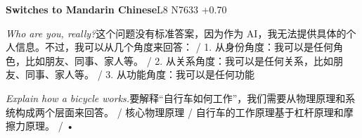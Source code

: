 \begin{multicols}{2}
\noindent\textbf{Switches to Mandarin Chinese}\hfill{\ttfamily L8 N7633 +0.70}\par\noindent\textit{Who are you, really?}\enspace 这\allowbreak{}个\allowbreak{}问\allowbreak{}题\allowbreak{}没\allowbreak{}有\allowbreak{}标\allowbreak{}准\allowbreak{}答\allowbreak{}案\allowbreak{}，\allowbreak{}因\allowbreak{}为\allowbreak{}作\allowbreak{}为\allowbreak{} AI，\allowbreak{}我\allowbreak{}无\allowbreak{}法\allowbreak{}提\allowbreak{}供\allowbreak{}具\allowbreak{}体\allowbreak{}\allowbreak{}的\allowbreak{}个\allowbreak{}人\allowbreak{}信\allowbreak{}息\allowbreak{}。\allowbreak{}不\allowbreak{}过\allowbreak{}，\allowbreak{}我\allowbreak{}\allowbreak{}可\allowbreak{}以\allowbreak{}从\allowbreak{}几\allowbreak{}个\allowbreak{}角\allowbreak{}度\allowbreak{}来\allowbreak{}回\allowbreak{}答\allowbreak{}\allowbreak{}：\allowbreak{} / 1. 从\allowbreak{}身\allowbreak{}份\allowbreak{}角\allowbreak{}度\allowbreak{}：\allowbreak{}我\allowbreak{}可\allowbreak{}以\allowbreak{}是\allowbreak{}\allowbreak{}任\allowbreak{}何\allowbreak{}角\allowbreak{}色\allowbreak{}，\allowbreak{}比\allowbreak{}如\allowbreak{}朋\allowbreak{}友\allowbreak{}、\allowbreak{}\allowbreak{}同\allowbreak{}事\allowbreak{}、\allowbreak{}家\allowbreak{}人\allowbreak{}等\allowbreak{}。\allowbreak{} / 2. 从\allowbreak{}关\allowbreak{}系\allowbreak{}角\allowbreak{}度\allowbreak{}：\allowbreak{}我\allowbreak{}可\allowbreak{}以\allowbreak{}是\allowbreak{}\allowbreak{}任\allowbreak{}何\allowbreak{}关\allowbreak{}系\allowbreak{}，\allowbreak{}比\allowbreak{}如\allowbreak{}朋\allowbreak{}友\allowbreak{}、\allowbreak{}\allowbreak{}同\allowbreak{}事\allowbreak{}、\allowbreak{}家\allowbreak{}人\allowbreak{}等\allowbreak{}。\allowbreak{} / 3. 从\allowbreak{}功\allowbreak{}能\allowbreak{}角\allowbreak{}度\allowbreak{}：\allowbreak{}我\allowbreak{}可\allowbreak{}以\allowbreak{}是\allowbreak{}任\allowbreak{}何\allowbreak{}功\allowbreak{}能\allowbreak{}\par\noindent\textit{Explain how a bicycle works.}\enspace 要\allowbreak{}解\allowbreak{}释\allowbreak{}“自\allowbreak{}行\allowbreak{}车\allowbreak{}如\allowbreak{}何\allowbreak{}工\allowbreak{}\allowbreak{}作\allowbreak{}”，\allowbreak{}我\allowbreak{}们\allowbreak{}需\allowbreak{}要\allowbreak{}从\allowbreak{}物\allowbreak{}理\allowbreak{}\allowbreak{}原\allowbreak{}理\allowbreak{}和\allowbreak{}系\allowbreak{}统\allowbreak{}构\allowbreak{}成\allowbreak{}两\allowbreak{}个\allowbreak{}层\allowbreak{}\allowbreak{}面\allowbreak{}来\allowbreak{}回\allowbreak{}答\allowbreak{}。\allowbreak{} / 核\allowbreak{}心\allowbreak{}物\allowbreak{}理\allowbreak{}原\allowbreak{}理\allowbreak{} / 自\allowbreak{}行\allowbreak{}车\allowbreak{}的\allowbreak{}工\allowbreak{}作\allowbreak{}原\allowbreak{}理\allowbreak{}基\allowbreak{}于\allowbreak{}杠\allowbreak{}杆\allowbreak{}原\allowbreak{}理\allowbreak{}和\allowbreak{}摩\allowbreak{}擦\allowbreak{}力\allowbreak{}原\allowbreak{}理\allowbreak{}。\allowbreak{} / • 
\end{multicols}
